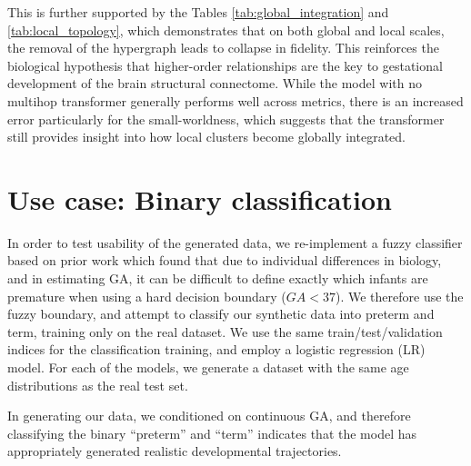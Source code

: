 \documentclass[sigconf, review]{acmart}
\begin{document}
This is further supported by the Tables \ref{tab:global_integration} and \ref{tab:local_topology}, which demonstrates that on both global and local scales, the removal of the hypergraph leads to collapse in fidelity. This reinforces the biological hypothesis that higher-order relationships are the key to gestational development of the brain structural connectome. 
While the model with no multihop transformer generally performs well across metrics, there is an increased error particularly for the small-worldness, which suggests that the transformer still provides insight into how local clusters become globally integrated.

\section{Use case: Binary classification}
In order to test usability of the generated data, we re-implement a fuzzy classifier based on prior work \cite{birch2025exploring} which found that due to individual differences in biology, and in estimating GA, it can be difficult to define exactly which infants are premature \cite{birch2025exploring, jukic2013length, moutquin2003classification, engle2006recommendation, karnati2020late} when using a hard decision boundary ($GA < 37$). We therefore use the fuzzy boundary, and attempt to classify our synthetic data into preterm and term, training only on the real dataset. We use the same train/test/validation indices for the classification training, and employ a logistic regression (LR) model. For each of the models, we generate a dataset with the same age distributions as the real test set.

In generating our data, we conditioned on continuous GA, and therefore classifying the binary ``preterm'' and ``term'' indicates that the model has appropriately generated realistic developmental trajectories. 
\end{document}

